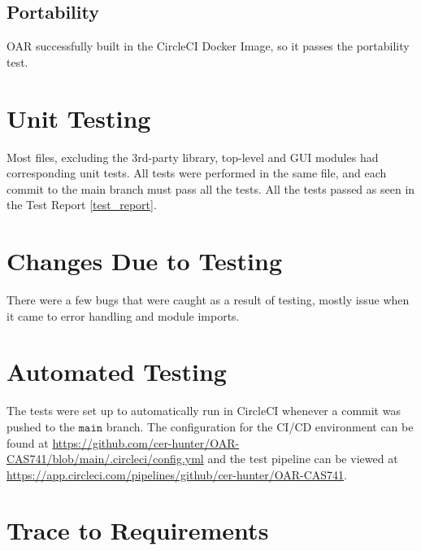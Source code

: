 \documentclass[12pt, titlepage]{article}
\begin{document}
\subsection{Portability}

OAR successfully built in the CircleCI Docker Image, so it passes the portability test.

\section{Unit Testing}

Most files, excluding the 3rd-party library, top-level and GUI modules had corresponding unit tests.
All tests were performed in the same file, and each commit to the main branch must pass all the tests.
All the tests passed as seen in the Test Report \ref{test_report}.

\section{Changes Due to Testing}

There were a few bugs that were caught as a result of testing, mostly issue when it came to error handling
and module imports.

\section{Automated Testing}

The tests were set up to automatically run in CircleCI \citep{CircleCI} whenever a commit was pushed to the $\mathtt{main}$ branch.
The configuration for the CI/CD environment can be found at \url{https://github.com/cer-hunter/OAR-CAS741/blob/main/.circleci/config.yml}
and the test pipeline can be viewed at \url{https://app.circleci.com/pipelines/github/cer-hunter/OAR-CAS741}.
		
\section{Trace to Requirements}
\end{document}
